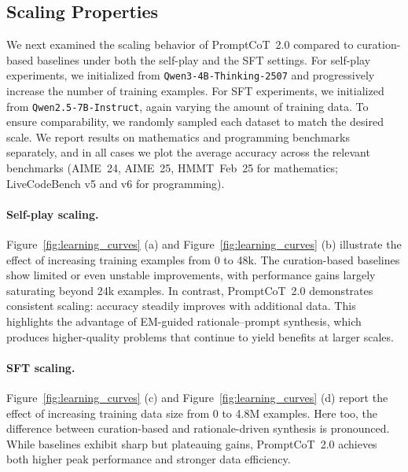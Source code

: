   
  \subsection{Scaling Properties}
  \label{sec:scaling}
  
  We next examined the scaling behavior of PromptCoT~2.0 compared to curation-based baselines under both the self-play and the SFT settings.  
  For self-play experiments, we initialized from \texttt{Qwen3-4B-Thinking-2507} and progressively increase the number of training examples.  
  For SFT experiments, we initialized from \texttt{Qwen2.5-7B-Instruct}, again varying the amount of training data.  
  To ensure comparability, we randomly sampled each dataset to match the desired scale.  
  We report results on mathematics and programming benchmarks separately, and in all cases we plot the average accuracy across the relevant benchmarks (AIME~24, AIME~25, HMMT~Feb~25 for mathematics; LiveCodeBench v5 and v6 for programming).  
  
  \paragraph{Self-play scaling.}  
  Figure~\ref{fig:learning_curves} (a) and Figure~\ref{fig:learning_curves} (b) illustrate the effect of increasing training examples from 0 to 48k.  
  The curation-based baselines show limited or even unstable improvements, with performance gains largely saturating beyond 24k examples.  
  In contrast, PromptCoT~2.0 demonstrates consistent scaling: accuracy steadily improves with additional data.  
  This highlights the advantage of EM-guided rationale–prompt synthesis, which produces higher-quality problems that continue to yield benefits at larger scales.  
  
  \paragraph{SFT scaling.}  
  Figure~\ref{fig:learning_curves} (c) and Figure~\ref{fig:learning_curves} (d) report the effect of increasing training data size from 0 to 4.8M examples.  
  Here too, the difference between curation-based and rationale-driven synthesis is pronounced.  
  While baselines exhibit sharp but plateauing gains, PromptCoT~2.0 achieves both higher peak performance and stronger data efficiency.  
  
  
  
